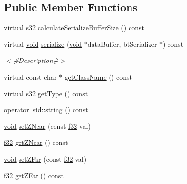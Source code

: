 \subsection*{Public Member Functions}
\begin{DoxyCompactItemize}
\item 
virtual \mbox{\hyperlink{_util_8h_aa62c75d314a0d1f37f79c4b73b2292e2}{s32}} \mbox{\hyperlink{classnjli_1_1_camera_a67d01c2010a70ccdbd3d9962bba57407}{calculate\+Serialize\+Buffer\+Size}} () const
\item 
virtual \mbox{\hyperlink{_thread_8h_af1e856da2e658414cb2456cb6f7ebc66}{void}} \mbox{\hyperlink{classnjli_1_1_camera_a5325bfcff03dcbe482f2d3ba080eb3a5}{serialize}} (\mbox{\hyperlink{_thread_8h_af1e856da2e658414cb2456cb6f7ebc66}{void}} $\ast$data\+Buffer, bt\+Serializer $\ast$) const
\begin{DoxyCompactList}\small\item\em $<$\#\+Description\#$>$ \end{DoxyCompactList}\item 
virtual const char $\ast$ \mbox{\hyperlink{classnjli_1_1_camera_ade06e4102661cf1f83a87160f3ebb372}{get\+Class\+Name}} () const
\item 
virtual \mbox{\hyperlink{_util_8h_aa62c75d314a0d1f37f79c4b73b2292e2}{s32}} \mbox{\hyperlink{classnjli_1_1_camera_ad5cb7de9888c547c740f35afc6fd3002}{get\+Type}} () const
\item 
\mbox{\hyperlink{classnjli_1_1_camera_aaa7de10337781527205a7eaa5f1c2204}{operator std\+::string}} () const
\item 
\mbox{\hyperlink{_thread_8h_af1e856da2e658414cb2456cb6f7ebc66}{void}} \mbox{\hyperlink{classnjli_1_1_camera_aecd11caf4880997cdaecef6c47d69c48}{set\+Z\+Near}} (const \mbox{\hyperlink{_util_8h_a5f6906312a689f27d70e9d086649d3fd}{f32}} val)
\item 
\mbox{\hyperlink{_util_8h_a5f6906312a689f27d70e9d086649d3fd}{f32}} \mbox{\hyperlink{classnjli_1_1_camera_ae388cdacbbe0a24c4048f063b83687a8}{get\+Z\+Near}} () const
\item 
\mbox{\hyperlink{_thread_8h_af1e856da2e658414cb2456cb6f7ebc66}{void}} \mbox{\hyperlink{classnjli_1_1_camera_a078a786623bfed82e5c42af635ff7c50}{set\+Z\+Far}} (const \mbox{\hyperlink{_util_8h_a5f6906312a689f27d70e9d086649d3fd}{f32}} val)
\item 
\mbox{\hyperlink{_util_8h_a5f6906312a689f27d70e9d086649d3fd}{f32}} \mbox{\hyperlink{classnjli_1_1_camera_a3e5c14ce4f79b8ab666390872ba9590a}{get\+Z\+Far}} () const
\item 

\end{DoxyCompactItemize}
